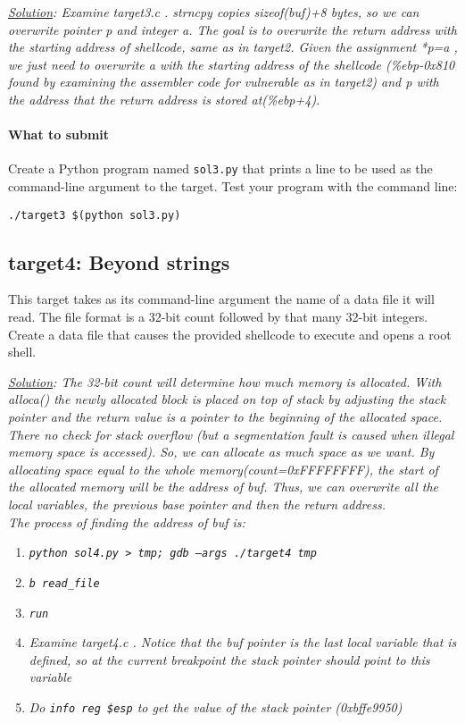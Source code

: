 \documentclass[letterpaper,12pt]{report}
\begin{document}
{\textit{\underline{Solution}:  Examine target3.c . strncpy copies sizeof(buf)+8 bytes, so we can overwrite pointer p and integer a. The goal is to overwrite the return address with the starting address of shellcode, same as in target2. Given the assignment *p=a , we just need to overwrite a with the starting address of the shellcode (\%ebp-0x810 found by examining the assembler code for vulnerable as in target2) and p with the address that the return address is stored at(\%ebp+4).}

\paragraph{What to submit}
Create a Python program named \texttt{sol3.py} that prints a line to be used as the command-line argument to the target.  Test your program with the command line:

\smallskip

\quad\texttt{./target3 \$(python sol3.py)}

\subsection*{target4: Beyond strings}
\label{sec:target4}

This target takes as its command-line argument the name of a data file it will read.  The file format is a 32-bit count followed by that many 32-bit integers.  Create a data file that causes the provided shellcode to execute and opens a root shell.

\smallskip

\textit{\underline{Solution}: The 32-bit count will determine how much memory is allocated. With alloca() the newly allocated block is placed on top of stack by adjusting the stack pointer and the return value is a pointer to the beginning of the allocated space.  There no check for stack overflow (but a segmentation fault is caused when illegal memory space is accessed). So, we can allocate as much space as we want. By allocating space equal to the whole memory(count=0xFFFFFFFF), the start of the allocated memory will be the address of buf. Thus, we can overwrite all the local variables, the previous base pointer and then the return address.   \\
The process of finding the address of buf is:
}
\begin{enumerate}
\item \textit{\texttt{python sol4.py > tmp; gdb --args ./target4 tmp}}
\item \textit{\texttt{b read\_file}}
\item \textit{\texttt{run}}
\item \textit{Examine target4.c . Notice that the buf pointer is the last local variable that is defined, so at the current breakpoint the stack pointer should point to this variable}
\item \textit{Do \texttt{info reg \$esp} to get the value of the stack pointer (0xbffe9950)}


\end{enumerate}}
\end{document}
